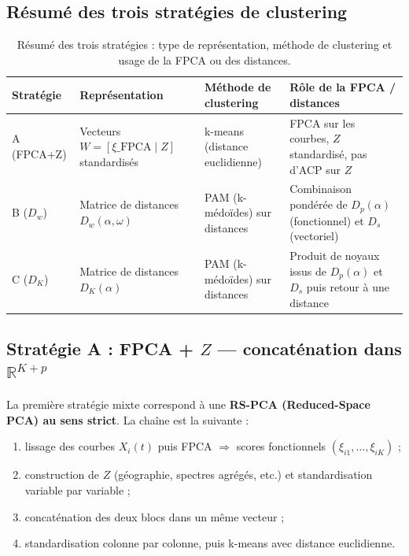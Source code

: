 \documentclass[11pt, a4paper]{article}
\newcommand{\R}{\mathbb{R}}
\newcommand{\Dp}{D_p}
\newcommand{\Dw}{D_w}
\newcommand{\DK}{D_K}
\begin{document}
\subsection{Résumé des trois stratégies de clustering}

\begin{table}[H]
\centering
\renewcommand{\arraystretch}{1.25}
\begin{tabular}{l p{3.2cm} p{3.4cm} p{3.4cm}}
  \toprule
  \textbf{Stratégie} & \textbf{Représentation} &
  \textbf{Méthode de clustering} & \textbf{Rôle de la FPCA / distances} \\
  \midrule
  A (FPCA+Z) &
  Vecteurs $W = [\xi\_{\text{FPCA}} \mid Z]$ standardisés &
  k-means (distance euclidienne) &
  FPCA sur les courbes, $Z$ standardisé, pas d'ACP sur $Z$ \\
  B ($\Dw$) &
  Matrice de distances $\Dw(\alpha,\omega)$ &
  PAM (k-médoïdes) sur distances &
  Combinaison pondérée de $\Dp(\alpha)$ (fonctionnel) et $D_s$ (vectoriel) \\
  C ($\DK$) &
  Matrice de distances $\DK(\alpha)$ &
  PAM (k-médoïdes) sur distances &
  Produit de noyaux issus de $\Dp(\alpha)$ et $D_s$ puis retour à une distance \\
  \bottomrule
\end{tabular}
\caption{Résumé des trois stratégies : type de représentation, méthode de
clustering et usage de la FPCA ou des distances.}
\end{table}

\subsection{Stratégie A : FPCA + $Z$ — concaténation dans $\R^{K+p}$}

La première stratégie mixte correspond à une \textbf{RS-PCA (Reduced-Space
PCA) au sens strict}. La chaîne est la suivante :
\begin{enumerate}[nosep]
  \item lissage des courbes $X_i(t)$ puis FPCA $\Rightarrow$ scores
        fonctionnels $(\xi_{i1}, \ldots, \xi_{iK})$ ;
  \item construction de $Z$ (géographie, spectres agrégés, etc.) et
        standardisation variable par variable ;
  \item concaténation des deux blocs dans un même vecteur ;
  \item standardisation colonne par colonne, puis k-means avec distance
        euclidienne.
\end{enumerate}
\end{document}
